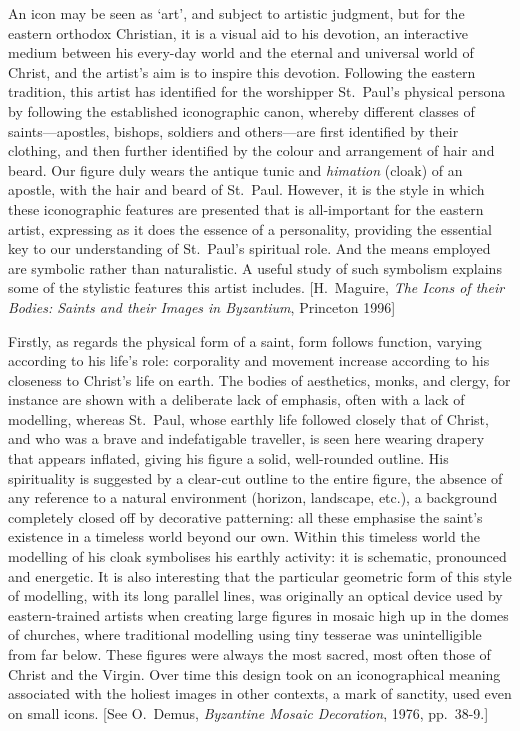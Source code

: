 \documentclass[a4paper,12pt]{article}
\begin{document}
An icon may be seen as `art', and subject to artistic judgment, but
for the eastern orthodox Christian, it is a visual aid to his
devotion, an interactive medium between his every-day world and the
eternal and universal world of Christ, and the artist's aim is to
inspire this devotion.  Following the eastern tradition, this artist
has identified for the worshipper St.~Paul's physical persona by
following the established iconographic canon, whereby different
classes of saints---apostles, bishops, soldiers and others---are first
identified by their clothing, and then further identified by the
colour and arrangement of hair and beard.  Our figure duly wears the
antique tunic and \textit{himation} (cloak) of an apostle, with the hair and
beard of St.~Paul.  However, it is the style in which these
iconographic features are presented that is all-important for the
eastern artist, expressing as it does the essence of a personality,
providing the essential key to our understanding of St.~Paul's
spiritual role.  And the means employed are symbolic rather than
naturalistic.  A useful study of such symbolism explains some of the
stylistic features this artist includes.  [H.~Maguire, \textit{The
    Icons of their Bodies: Saints and their Images in Byzantium},
  Princeton 1996]

Firstly, as regards the physical form of a saint, form follows
function, varying according to his life's role: corporality and
movement increase according to his closeness to Christ's life on
earth.  The bodies of aesthetics, monks, and clergy, for instance are
shown with a deliberate lack of emphasis, often with a lack of
modelling, whereas St.~Paul, whose earthly life followed closely that
of Christ, and who was a brave and indefatigable traveller, is seen
here wearing drapery that appears inflated, giving his figure a solid,
well-rounded outline.  His spirituality is suggested by a clear-cut
outline to the entire figure, the absence of any reference to a
natural environment (horizon, landscape, etc.), a background
completely closed off by decorative patterning: all these emphasise
the saint’s existence in a timeless world beyond our own.  Within
this timeless world the modelling of his cloak symbolises his earthly
activity: it is schematic, pronounced and energetic.  It is also
interesting that the particular geometric form of this style of
modelling, with its long parallel lines, was originally an optical
device used by eastern-trained artists when creating large figures in
mosaic high up in the domes of churches, where traditional modelling
using tiny tesserae was unintelligible from far below.  These figures
were always the most sacred, most often those of Christ and the
Virgin.  Over time this design took on an iconographical meaning
associated with the holiest images in other contexts, a mark of
sanctity, used even on small icons. [See O.~Demus, \textit{Byzantine Mosaic
  Decoration}, 1976, pp.~38-9.]
\end{document}
